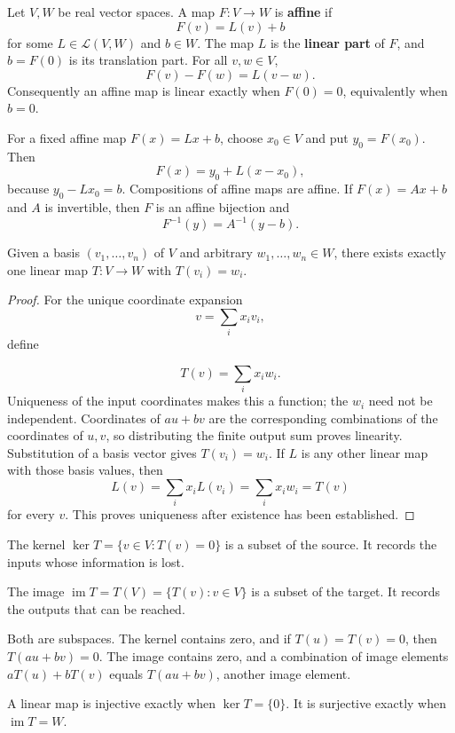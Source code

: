 \begin{definition}\label{def:affine-map}
Let $V,W$ be real vector spaces. A map $F:V\to W$ is \textbf{affine} if
\[
F(v)=L(v)+b
\]
for some $L\in\mathcal L(V,W)$ and $b\in W$. The map $L$ is the
\textbf{linear part} of $F$, and $b=F(0)$ is its translation part. For all
$v,w\in V$,
\[
F(v)-F(w)=L(v-w).
\]
Consequently an affine map is linear exactly when $F(0)=0$, equivalently
when $b=0$.
\end{definition}
For a fixed affine map $F(x)=Lx+b$, choose $x_0\in V$ and put
$y_0=F(x_0)$. Then
\[
F(x)=y_0+L(x-x_0),
\]
because $y_0-Lx_0=b$. Compositions of affine maps are affine. If
$F(x)=Ax+b$ and $A$ is invertible, then $F$ is an affine bijection and
\[
F^{-1}(y)=A^{-1}(y-b).
\]

\begin{theorem}\label{thm:map-from-basis}
Given a basis $(v_1,\ldots,v_n)$ of $V$ and arbitrary $w_1,\ldots,w_n\in W$,
there exists exactly one linear map $T:V\to W$ with $T(v_i)=w_i$.
\end{theorem}
\begin{proof}
For the unique coordinate expansion
\[
v=\sum_i x_iv_i,
\]
 define

\[
T(v)=\sum_i x_iw_i.
\]
 Uniqueness of the input coordinates makes this a
function; the $w_i$ need not be independent. Coordinates of $au+bv$ are
the corresponding combinations of the coordinates of $u,v$, so distributing
the finite output sum proves linearity. Substitution of a basis vector
gives $T(v_i)=w_i$. If $L$ is any other linear map with those basis values,
then
\[
L(v)=\sum_i x_iL(v_i)=\sum_i x_iw_i=T(v)
\]
 for every $v$. This proves
uniqueness after existence has been established.
\end{proof}
\begin{definition}[Kernel]
The kernel $\ker T=\{v\in V:T(v)=0\}$ is a subset of the source.
It records the inputs whose information is lost.
\end{definition}
\begin{definition}[Image]
The image $\operatorname{im}T=T(V)=\{T(v):v\in V\}$ is a subset of the
target. It records the outputs that can be reached.
\end{definition}
Both are subspaces. The kernel contains zero, and if $T(u)=T(v)=0$, then
$T(au+bv)=0$. The image contains zero, and a combination of image elements
$aT(u)+bT(v)$ equals $T(au+bv)$, another image element.
\begin{proposition}
A linear map is injective exactly when $\ker T=\{0\}$. It is surjective
exactly when $\operatorname{im}T=W$.
\end{proposition}
